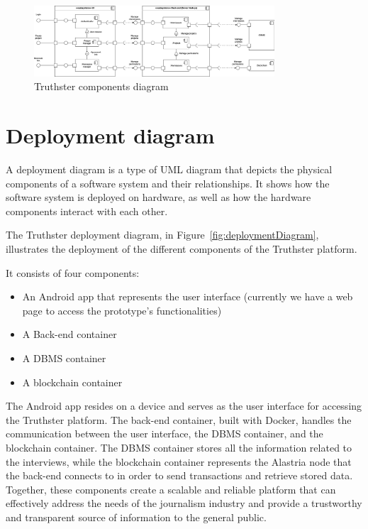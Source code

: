 \documentclass[target=mst,aauheader=]{thud}
\begin{document}
\begin{figure}
    \centering
    \includegraphics[width=0.8\textwidth]{images/componentDiagram.png}
    \caption{Truthster components diagram}
    \label{fig:componentDiagram}
\end{figure}

\section{Deployment diagram}

A deployment diagram is a type of UML diagram that depicts the physical components of a software system and their relationships. It shows how the software system is deployed on hardware, as well as how the hardware components interact with each other.

The Truthster deployment diagram, in Figure~\ref{fig:deploymentDiagram}, illustrates the deployment of the different components of the Truthster platform.\par
It consists of four components: 

    \begin{itemize}

        \item An Android app that represents the user interface (currently we have a web page to access the prototype's functionalities)
        \item A Back-end container
        \item A DBMS container
        \item A blockchain container

    \end{itemize} 

The Android app resides on a device and serves as the user interface for accessing the Truthster platform. The back-end container, built with Docker, handles the communication between the user interface, the DBMS container, and the blockchain container. The DBMS container stores all the information related to the interviews, while the blockchain container represents the Alastria node that the back-end connects to in order to send transactions and retrieve stored data. Together, these components create a scalable and reliable platform that can effectively address the needs of the journalism industry and provide a trustworthy and transparent source of information to the general public.
\end{document}
